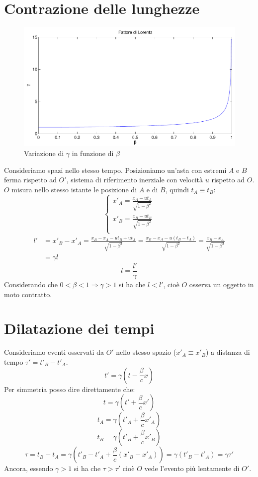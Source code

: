 \section{Contrazione delle lunghezze}
\begin{figure}[htbp]
   \centering
   \includegraphics[scale=0.5]{immagini/fisica1/beta_gamma}
   \caption{Variazione di $\gamma$ in funzione di $\beta$}
\end{figure}
Consideriamo spazi nello stesso tempo. Posizioniamo un'asta con estremi $A$ e $B$ ferma rispetto ad $O'$, sistema di riferimento inerziale con velocità $u$ rispetto ad $O$.
$O$ misura nello stesso istante le posizione di $A$ e di $B$, quindi $t_A\equiv t_B$:
\[\left\{
\begin{array}{l}
x'_A=\frac{x_A-ut_A}{\sqrt{1-\beta^2}}\\
x'_B=\frac{x_B-ut_B}{\sqrt{1-\beta^2}}\\
\end{array}
\right.\]
\begin{align*}
l'&=x'_B-x'_A=\frac{x_B-x_A-ut_B+ut_A}{\sqrt{1-\beta^2}}=\frac{x_B-x_A-u(t_B-t_A)}{\sqrt{1-\beta^2}}=\frac{x_B-x_A}{\sqrt{1-\beta^2}}\\
&=\gamma l
\end{align*}
\begin{equation}
l=\frac{l'}{\gamma}
\end{equation}
Considerando che $0<\beta<1\Rightarrow\gamma>1$ si ha che $l<l'$, cioè $O$ osserva un oggetto in moto contratto.

\section{Dilatazione dei tempi}
Consideriamo eventi osservati da $O'$ nello stesso spazio ($x'_A\equiv x'_B$) a distanza di tempo $\tau'=t'_B-t'_A$.
\[t'=\gamma\left(t-\frac{\beta}{c}x\right)\]
Per simmetria posso dire direttamente che:
\[t=\gamma\left(t'+\frac{\beta}{c}x'\right)\]
\[t_A=\gamma\left(t'_A+\frac{\beta}{c}x'_A\right)\]
\[t_B=\gamma\left(t'_B+\frac{\beta}{c}x'_B\right)\]
\begin{equation}
\tau=t_B-t_A=\gamma\left(t'_B-t'_A+\frac{\beta}{c}\left(x'_B-x'_A\right)\right)=\gamma\left(t'_B-t'_A\right)=\gamma\tau'
\end{equation}
Ancora, essendo $\gamma>1$ si ha che $\tau>\tau'$ cioè $O$ vede l'evento più lentamente di $O'$.

